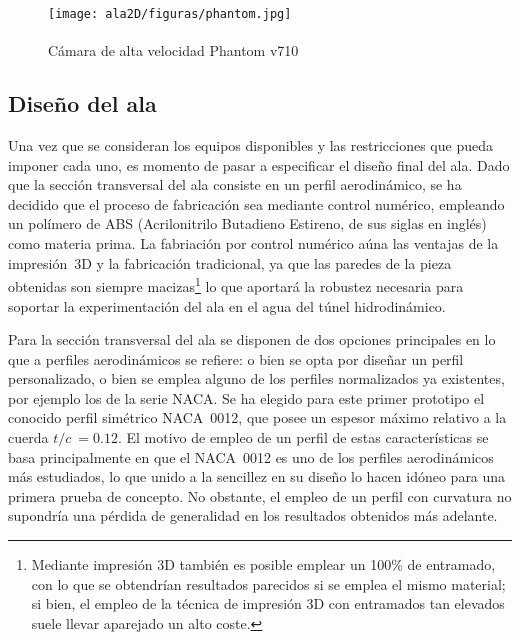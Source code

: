 \begin{figure}
\centering
\texttt{[image: ala2D/figuras/phantom.jpg]}
\caption{Cámara de alta velocidad Phantom\textsuperscript{\textregistered} v710}
\end{figure}


\subsection{Diseño del ala}

Una vez que se consideran los equipos disponibles y las restricciones que pueda imponer cada uno, es momento de pasar a especificar el diseño final del ala. Dado que la sección transversal del ala consiste en un perfil aerodinámico, se ha decidido que el proceso de fabricación sea mediante control numérico, empleando un polímero de ABS (Acrilonitrilo Butadieno Estireno, de sus siglas en inglés) como materia prima. La fabriación por control numérico aúna las ventajas de la impresión~3D y la fabricación tradicional, ya que las paredes de la pieza obtenidas son siempre macizas\footnote{Mediante impresión 3D también es posible emplear un 100\% de entramado, con lo que se obtendrían resultados parecidos si se emplea el mismo material; si bien, el empleo de la técnica de impresión 3D con entramados tan elevados suele llevar aparejado un alto coste.} lo que aportará la robustez necesaria para soportar la experimentación del ala en el agua del túnel hidrodinámico.

Para la sección transversal del ala se disponen de dos opciones principales en lo que a perfiles aerodinámicos se refiere: o bien se opta por diseñar un perfil personalizado, o bien se emplea alguno de los perfiles normalizados ya existentes, por ejemplo los de la serie NACA. Se ha elegido para este primer prototipo el conocido perfil simétrico NACA~0012, que posee un espesor máximo relativo a la cuerda $t/c\ = 0.12$. El motivo de empleo de un perfil de estas características se basa principalmente en que el NACA~0012 es uno de los perfiles aerodinámicos más estudiados, lo que unido a la sencillez en su diseño lo hacen idóneo para una primera prueba de concepto. No obstante, el empleo de un perfil con curvatura no supondría una pérdida de generalidad en los resultados obtenidos más adelante.

